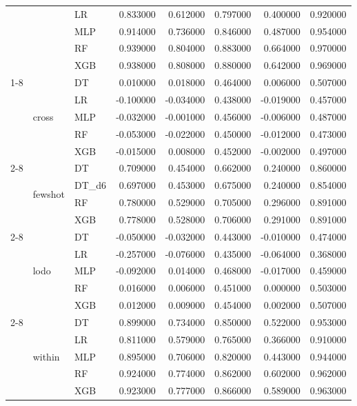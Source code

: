 \begin{tabular}{lllrrrrr}
 &  & LR & 0.833000 & 0.612000 & 0.797000 & 0.400000 & 0.920000 \\
 &  & MLP & 0.914000 & 0.736000 & 0.846000 & 0.487000 & 0.954000 \\
 &  & RF & 0.939000 & 0.804000 & 0.883000 & 0.664000 & 0.970000 \\
 &  & XGB & 0.938000 & 0.808000 & 0.880000 & 0.642000 & 0.969000 \\
\cline{1-8} \cline{2-8}
\multirow[t]{19}{*}{core_noart} & \multirow[t]{5}{*}{cross} & DT & 0.010000 & 0.018000 & 0.464000 & 0.006000 & 0.507000 \\
 &  & LR & -0.100000 & -0.034000 & 0.438000 & -0.019000 & 0.457000 \\
 &  & MLP & -0.032000 & -0.001000 & 0.456000 & -0.006000 & 0.487000 \\
 &  & RF & -0.053000 & -0.022000 & 0.450000 & -0.012000 & 0.473000 \\
 &  & XGB & -0.015000 & 0.008000 & 0.452000 & -0.002000 & 0.497000 \\
\cline{2-8}
 & \multirow[t]{4}{*}{fewshot} & DT & 0.709000 & 0.454000 & 0.662000 & 0.240000 & 0.860000 \\
 &  & DT_d6 & 0.697000 & 0.453000 & 0.675000 & 0.240000 & 0.854000 \\
 &  & RF & 0.780000 & 0.529000 & 0.705000 & 0.296000 & 0.891000 \\
 &  & XGB & 0.778000 & 0.528000 & 0.706000 & 0.291000 & 0.891000 \\
\cline{2-8}
 & \multirow[t]{5}{*}{lodo} & DT & -0.050000 & -0.032000 & 0.443000 & -0.010000 & 0.474000 \\
 &  & LR & -0.257000 & -0.076000 & 0.435000 & -0.064000 & 0.368000 \\
 &  & MLP & -0.092000 & 0.014000 & 0.468000 & -0.017000 & 0.459000 \\
 &  & RF & 0.016000 & 0.006000 & 0.451000 & 0.000000 & 0.503000 \\
 &  & XGB & 0.012000 & 0.009000 & 0.454000 & 0.002000 & 0.507000 \\
\cline{2-8}
 & \multirow[t]{5}{*}{within} & DT & 0.899000 & 0.734000 & 0.850000 & 0.522000 & 0.953000 \\
 &  & LR & 0.811000 & 0.579000 & 0.765000 & 0.366000 & 0.910000 \\
 &  & MLP & 0.895000 & 0.706000 & 0.820000 & 0.443000 & 0.944000 \\
 &  & RF & 0.924000 & 0.774000 & 0.862000 & 0.602000 & 0.962000 \\
 &  & XGB & 0.923000 & 0.777000 & 0.866000 & 0.589000 & 0.963000 \\

\end{tabular}
